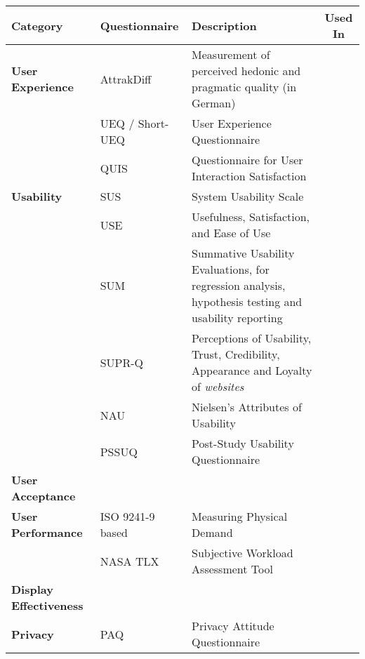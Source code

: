 \begin{tabular}{p{3.5cm}p{4.5cm}p{7.5cm}c}
\toprule
\textbf{Category} & \textbf{Questionnaire} & \textbf{Description} & \textbf{Used In} \\ \midrule





\textbf{User Experience} & AttrakDiff \cite{hassenzahl2003attrakdiff} & Measurement of perceived hedonic and pragmatic quality (in German) & \cite{Beyer2011}   \\
& UEQ / Short-UEQ \cite{UEQSurvey} & User Experience Questionnaire &    \\ 
& QUIS \cite{harper1993improving} & Questionnaire for User Interaction Satisfaction  &  \\ \hline




\textbf{Usability} & SUS &  System Usability Scale & \cite{alt2011digifieds}  \\
& USE & Usefulness, Satisfaction, and Ease of Use  & \\
& SUM \cite{sauro2005method} &  Summative Usability Evaluations, for regression analysis, hypothesis testing and usability reporting &  \\
& SUPR-Q \cite{SUPRQSurvey} &  Perceptions of Usability, Trust, Credibility, Appearance and Loyalty of \textit{websites}  & \\
& NAU \cite{nielsen1994usability} & Nielsen's Attributes of Usability & \\
& PSSUQ \cite{Garcia2013UXResearch} & Post-Study Usability Questionnaire & \\ \hline


\textbf{User Acceptance} &  &  &  \\ \hline



\textbf{User Performance} & ISO 9241-9 based \cite{chamsaz2010empirical} & Measuring Physical Demand & \cite{natapov2009iso, kratz2012palmspace} \\
& NASA TLX \cite{SurveyNASATLX} & Subjective Workload Assessment Tool & \cite{bailly2012shoesense} \\ \hline




\textbf{Display Effectiveness} &  &   &   \\ \hline



\textbf{Privacy} & PAQ \cite{chignell2003privacy} & Privacy Attitude Questionnaire &   \\ \hline




\end{tabular}
